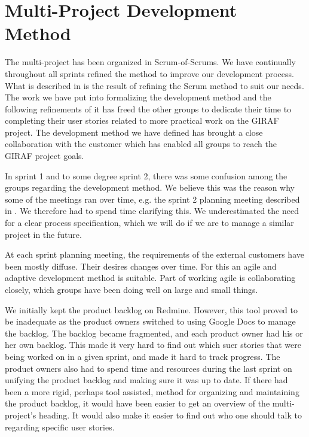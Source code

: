 \section{Multi-Project Development Method}\label{conc:multi_project_process_eval}
The multi-project has been organized in Scrum-of-Scrums. We have continually throughout all sprints refined the method to improve our development process. What is described in  is the result of refining the Scrum method to suit our needs. The work we have put into formalizing the development method and the following refinements of it has freed the other groups to dedicate their time to completing their user stories related to more practical work on the GIRAF project. The development method we have defined has brought a close collaboration with the customer which has enabled all groups to reach the GIRAF project goals.

In sprint 1 and to some degree sprint 2, there was some confusion among the groups regarding the development method. We believe this was the reason why some of the meetings ran over time, e.g. the \db sprint 2 planning meeting described in . We therefore had to spend time clarifying this. We underestimated the need for a clear process specification, which we will do if we are to manage a similar project in the future.

At each sprint planning meeting, the requirements of the external customers have been mostly diffuse. Their desires changes over time. For this an agile and adaptive development method is suitable. Part of working agile is collaborating closely, which groups have been doing well on large and small things. 

We initially kept the product backlog on Redmine. However, this tool proved to be inadequate as the product owners switched to using Google Docs to manage the backlog. The backlog became fragmented, and each product owner had his or her own backlog. This made it very hard to find out which suer stories that were being worked on in a given sprint, and made it hard to track progress. The product owners also had to spend time and resources during the last sprint on unifying the product backlog and making sure it was up to date. If there had been a more rigid, perhaps tool assisted, method for organizing and maintaining the product backlog, it would have been easier to get an overview of the multi-project's heading. It would also make it easier to find out who one should talk to regarding specific user stories.

